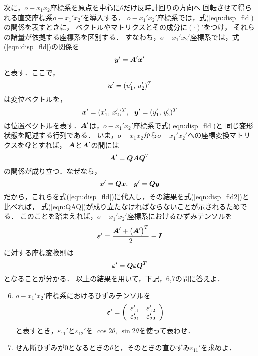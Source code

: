 \documentclass[10pt,a4j]{jarticle}
\begin{document}
次に，$o-x_1x_2$座標系を原点を中心に$\theta$だけ反時計回りの方向へ
回転させて得られる直交座標系$o-x_1'x_2'$を導入する．
$o-x_1'x_2'$座標系では，式(\ref{eqn:disp_fld})の関係を表すときに，
ベクトルやマトリクスとその成分に$(\cdot)'$をつけ，
それらの諸量が依拠する座標系を区別する．
すなわち，$o-x_1'x_2'$座標系では，式(\ref{eqn:disp_fld})の関係を
\begin{equation}
	\mbox{\boldmath $y$}'=\mbox{\boldmath $A$}'\mbox{\boldmath $x$}'
	\label{eqn:disp_fld2}
\end{equation}
と表す．ここで，
\begin{equation}
	\mbox{\boldmath $u$}'=(u_1',\, u_2')^T
\end{equation}
は変位ベクトルを，
\begin{equation}
	\mbox{\boldmath $x$}'=(x_1',\, x_2')^T, \ \ \mbox{\boldmath $y$}'=(y_1',\, y_2')^T
\end{equation}
は位置ベクトルを表す．$\mbox{\boldmath $A$}'$は，$o-x_1'x_2'$座標系で式(\ref{eqn:disp_fld})と
同じ変形状態を記述する行列である．
いま，$o-x_1x_2$から$o-x_1'x_2'$への座標変換マトリクスを$\mbox{\boldmath $Q$}$とすれば，
$\mbox{\boldmath $A$}$と$\mbox{\boldmath $A$}'$の間には
\begin{equation}
	\mbox{\boldmath $A$}'=\mbox{\boldmath $Q$}\mbox{\boldmath $A$}\mbox{\boldmath $Q$}^T
	\label{eqn:QAQ}
\end{equation}
の関係が成り立つ．なぜなら，
\[
	\mbox{\boldmath $x$}'=\mbox{\boldmath $Qx$}, \ \ \mbox{\boldmath $y$}'=\mbox{\boldmath $Qy$}
\]
だから，これらを式(\ref{eqn:disp_fld})に代入し，その結果を式(\ref{eqn:disp_fld2})と比べれば，
式(\ref{eqn:QAQ})が成り立たなければならないことが示されるためでる．
このことを踏まえれば，$o-x_1'x_2'$座標系におけるひずみテンソルを
\begin{equation}
	\mbox{\boldmath $\varepsilon$}'=\frac{\mbox{\boldmath $A$}'+\left(\mbox{\boldmath $A$}'\right)^T}{2}-\mbox{\boldmath $I$}
	\label{eqn:epsd_def}
\end{equation}
に対する座標変換則は
\begin{equation}
	\mbox{\boldmath $\varepsilon$}'=\mbox{\boldmath $Q$}\mbox{\boldmath $\varepsilon$}\mbox{\boldmath $Q$}^T
	\label{eqn:QeQ}
\end{equation}
となることが分かる．
以上の結果を用いて，下記，6,7の問に答えよ．
\begin{enumerate}
\setcounter{enumi}{5}
\item
	$o-x_1'x_2'$座標系におけるひずみテンソルを
	\[
	\mbox{\boldmath $\varepsilon$}'
	=
	\left(
	\begin{array}{cc}
		\varepsilon_{11}' & \varepsilon_{12}' \\
		\varepsilon_{21}' & \varepsilon_{22}'
	\end{array}
	\right)
	\]
	と表すとき，$\varepsilon_{11}'$と$\varepsilon_{12}'$を
	$\cos 2\theta, \, \sin 2\theta$を使って表わせ．
\item
	せん断ひずみが0となるときの$\theta$と，そのときの直ひずみ$\varepsilon_{11}'$を求めよ．
\end{enumerate}
\end{document}
